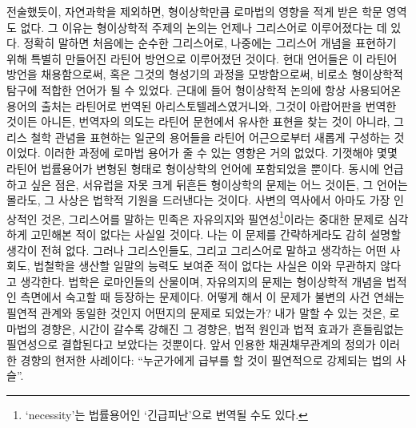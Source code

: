 전술했듯이,
자연과학을 제외하면,
형이상학만큼 로마법의 영향을 적게 받은 학문 영역도 없다.
그 이유는 형이상학적 주제의 논의는 언제나 그리스어로 이루어졌다는 데 있다.
정확히 말하면 처음에는 순수한 그리스어로,
나중에는 그리스어 개념을 표현하기 위해 특별히 만들어진 라틴어 방언으로
이루어졌던 것이다.
현대 언어들은 이 라틴어 방언을 채용함으로써,
혹은 그것의 형성기의 과정을 모방함으로써,
비로소
형이상학적 탐구에 적합한 언어가 될 수 있었다.
근대에 들어 형이상학적 논의에 항상 사용되어온 용어의 출처는
라틴어로 번역된 아리스토텔레스였거니와,
그것이 아랍어판을 번역한 것이든 아니든,
번역자의 의도는
라틴어 문헌에서 유사한 표현을 찾는 것이 아니라,
그리스 철학 관념을 표현하는 일군의 용어들을
라틴어 어근으로부터
새롭게 구성하는 것이었다.
이러한 과정에 로마법 용어가 줄 수 있는 영향은 거의 없었다.
기껏해야 몇몇 라틴어 법률용어가 변형된 형태로
형이상학의 언어에 포함되었을 뿐이다.
동시에 언급하고 싶은 점은,
서유럽을 자못 크게 뒤흔든 형이상학의 문제는 어느 것이든,
그 언어는 몰라도,
그 사상은 법학적 기원을 드러낸다는 것이다.
사변의 역사에서 아마도 가장 인상적인 것은,
그리스어를 말하는 민족은
자유의지와 필연성\footnote{%
  `necessity'는 법률용어인 `긴급피난'으로 번역될 수도 있다.
}이라는 중대한 문제로 심각하게 고민해본 적이 없다는 사실일 것이다.
나는 이 문제를 간략하게라도 감히 설명할 생각이 전혀 없다.
그러나 그리스인들도, 그리고 그리스어로 말하고 생각하는 어떤 사회도,
법철학을 생산할 일말의 능력도 보여준 적이 없다는 사실은
이와 무관하지 않다고 생각한다.
법학은 로마인들의 산물이며,
자유의지의 문제는 형이상학적 개념을 법적인 측면에서 숙고할 때 등장하는
문제이다.
어떻게 해서 이 문제가
불변의 사건 연쇄는 필연적 관계와 동일한 것인지 어떤지의
문제로 되었는가?
내가 말할 수 있는 것은,
로마법의 경향은,
시간이 갈수록 강해진 그 경향은,
법적 원인과 법적 효과가
흔들림없는
필연성으로 결합된다고
보았다는 것뿐이다.
앞서 인용한 채권채무관계의 정의가 이러한 경향의 현저한 사례이다:
``누군가에게 급부를 할 것이 필연적으로 강제되는
법의 사슬''.

